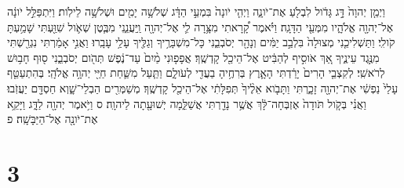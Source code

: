 \documentclass{openreader}
\begin{document}
וַיְמַ֤ן יְהוָה֙ דָּ֣ג גָּדֹ֔ול לִבְלֹ֖עַ אֶת־יֹונָ֑ה וַיְהִ֤י יֹונָה֙ בִּמְעֵ֣י הַדָּ֔ג שְׁלֹשָׁ֥ה יָמִ֖ים וּשְׁלֹשָׁ֥ה לֵילֹֽות׃ וַיִּתְפַּלֵּ֣ל יֹונָ֔ה אֶל־יְהוָ֖ה אֱלֹהָ֑יו מִמְּעֵ֖י הַדָּגָֽה׃ וַיֹּ֗אמֶר קָ֠רָאתִי מִצָּ֥רָה לִ֛י אֶל־יְהוָ֖ה וַֽיַּעֲנֵ֑נִי מִבֶּ֧טֶן שְׁאֹ֛ול שִׁוַּ֖עְתִּי שָׁמַ֥עְתָּ קֹולִֽי׃ וַתַּשְׁלִיכֵ֤נִי מְצוּלָה֙ בִּלְבַ֣ב יַמִּ֔ים וְנָהָ֖ר יְסֹבְבֵ֑נִי כָּל־מִשְׁבָּרֶ֥יךָ וְגַלֶּ֖יךָ עָלַ֥י עָבָֽרוּ׃ וַאֲנִ֣י אָמַ֔רְתִּי נִגְרַ֖שְׁתִּי מִנֶּ֣גֶד עֵינֶ֑יךָ אַ֚ךְ אֹוסִ֣יף לְהַבִּ֔יט אֶל־הֵיכַ֖ל קָדְשֶֽׁךָ׃ אֲפָפ֤וּנִי מַ֨יִם֙ עַד־נֶ֔פֶשׁ תְּהֹ֖ום יְסֹבְבֵ֑נִי ס֖וּף חָב֥וּשׁ לְרֹאשִֽׁי׃ לְקִצְבֵ֤י הָרִים֙ יָרַ֔דְתִּי הָאָ֛רֶץ בְּרִחֶ֥יהָ בַעֲדִ֖י לְעֹולָ֑ם וַתַּ֧עַל מִשַּׁ֛חַת חַיַּ֖י יְהוָ֥ה אֱלֹהָֽי׃ בְּהִתְעַטֵּ֤ף עָלַי֙ נַפְשִׁ֔י אֶת־יְהוָ֖ה זָכָ֑רְתִּי וַתָּבֹ֤וא אֵלֶ֨יךָ֙ תְּפִלָּתִ֔י אֶל־הֵיכַ֖ל קָדְשֶֽׁךָ׃ מְשַׁמְּרִ֖ים הַבְלֵי־שָׁ֑וְא חַסְדָּ֖ם יַעֲזֹֽבוּ׃ וַאֲנִ֗י בְּקֹ֤ול תֹּודָה֙ אֶזְבְּחָה־לָּ֔ךְ אֲשֶׁ֥ר נָדַ֖רְתִּי אֲשַׁלֵּ֑מָה יְשׁוּעָ֖תָה לַיהוָֽה׃ ס וַיֹּ֥אמֶר יְהוָ֖ה לַדָּ֑ג וַיָּקֵ֥א אֶת־יֹונָ֖ה אֶל־הַיַּבָּשָֽׁה׃ פ \section*{3}
\end{document}
